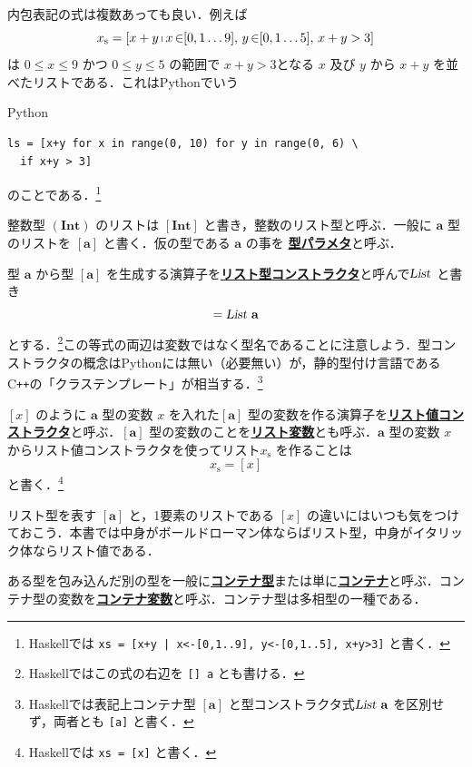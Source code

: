 \documentclass[a5paper,twoside,fleqn,draft]{jsbook}
\newcommand{\programminglanguage}[1]{\textsf{#1}}
\newcommand{\cxx}{\programminglanguage{C}\texttt{++}}
\newcommand{\haskell}{\programminglanguage{Haskell}}
\newcommand{\python}{\programminglanguage{Python}}
\newcommand{\keyword}[1]{{\underline{\textbf{#1}}}}
\newcommand{\code}[1]{\texttt{#1}}
\newenvironment{pythoncode}{\begin{itembox}[r]{\python}}{\end{itembox}}
\DeclareMathOperator{\mFrom}{\in}
\newcommand{\mType}[1]{\mathbf{#1}} %
\newcommand{\mA}{\mType{a}}
\newcommand{\mIntType}{\mType{Int}}
\newcommand{\mTypeConstructor}[1]{\textsl{#1}}
\DeclareMathOperator{\mListTypeConstructor}{\mTypeConstructor{List}}
\newcommand{\mList}[1]{{#1}_\mathrm{s}}
\DeclareMathOperator{\mListComp}{\shortmid}
\begin{document}
内包表記の式は複数あっても良い．例えば
\begin{equation}
  \mList{x}
  =[x+y\mListComp x\mFrom[0,1\dots9],\,y\mFrom[0,1\dots5],\,x+y>3]
\end{equation}
は $0\le x\le9$ かつ $0\le y\le5$ の範囲で $x+y>3$となる $x$ 及び $y$ から $x+y$ を並べたリストである．これは\python でいう
\begin{pythoncode}
\begin{verbatim}
ls = [x+y for x in range(0, 10) for y in range(0, 6) \
  if x+y > 3]
\end{verbatim}
\end{pythoncode}
のことである．\footnote{\haskell では \code{xs = [x+y | x<-[0,1..9], y<-[0,1..5], x+y>3]} と書く．}


整数型 $(\mIntType)$ のリストは $[\mIntType]$ と書き，整数のリスト型と呼ぶ．一般に $\mA$ 型のリストを $[\mA]$ と書く．仮の型である $\mA$ の事を \keyword{型パラメタ}と呼ぶ．

型 $\mA$ から型 $[\mA]$ を生成する演算子を\keyword{リスト型コンストラクタ}と呼んで$\mListTypeConstructor$ と書き
\begin{equation}
  [\mA]
  =\mListTypeConstructor\,\mA
\end{equation}
とする．\footnote{\haskell ではこの式の右辺を \code{[] a} とも書ける．}この等式の両辺は変数ではなく型名であることに注意しよう．型コンストラクタの概念は\python には無い（必要無い）が，静的型付け言語である\cxx の「クラステンプレート」が相当する．\footnote{\haskell では表記上コンテナ型 $[\mA]$ と型コンストラクタ式$\mListTypeConstructor\,\mA $ を区別せず，両者とも \code{[a]} と書く．}

$[x]$ のように $\mA$ 型の変数 $x$ を入れた$[\mA]$ 型の変数を作る演算子を\keyword{リスト値コンストラクタ}と呼ぶ．$[\mA]$ 型の変数のことを\keyword{リスト変数}とも呼ぶ．$\mA$ 型の変数 $x$ からリスト値コンストラクタを使ってリスト$\mList{x}$ を作ることは
\begin{equation}
  \mList{x}
  =[x]
\end{equation}
と書く．\footnote{\haskell では \code{xs = [x]} と書く．}

リスト型を表す $[\mA]$ と，1要素のリストである $[x]$ の違いにはいつも気をつけておこう．本書では中身がボールドローマン体ならばリスト型，中身がイタリック体ならリスト値である．

ある型を包み込んだ別の型を一般に\keyword{コンテナ型}または単に\keyword{コンテナ}と呼ぶ．コンテナ型の変数を\keyword{コンテナ変数}と呼ぶ．コンテナ型は多相型の一種である．
\end{document}
